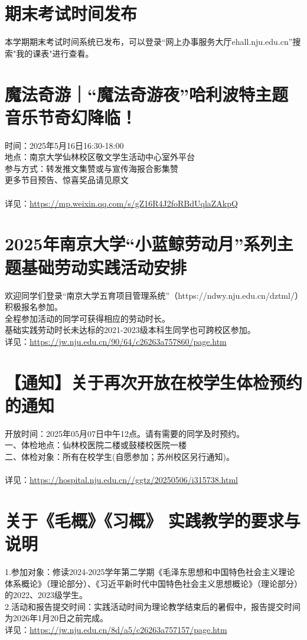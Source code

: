 \documentclass[letterpaper, 12pt]{article}
\begin{document}
\begin{multicols}{2}
\section{期末考试时间发布} %
本学期期末考试时间系统已发布，可以登录“网上办事服务大厅ehall.nju.edu.cn”搜索"我的课表"进行查看。
\section{魔法奇游｜“魔法奇游夜”哈利波特主题音乐节奇幻降临！} %
时间：2025年5月16日16:30-18:00
\\地点：南京大学仙林校区敬文学生活动中心室外平台
\\参与方式：转发推文集赞或与宣传海报合影集赞
\\更多节目预告、惊喜奖品请见原文
\\
\\详见：\url{https://mp.weixin.qq.com/s/gZ16R4J2foRBdUqlaZAkpQ}

\section{2025年南京大学“小蓝鲸劳动月”系列主题基础劳动实践活动安排} %
欢迎同学们登录“南京大学五育项目管理系统”（https://ndwy.nju.edu.cn/dztml/）积极报名参加。
\\全程参加活动的同学可获得相应的劳动时长。
\\基础实践劳动时长未达标的2021-2023级本科生同学也可跨校区参加。
\\详见：\url{https://jw.nju.edu.cn/90/64/c26263a757860/page.htm}

\section{【通知】关于再次开放在校学生体检预约的通知} %
开放时间：2025年05月07日中午12点。请有需要的同学及时预约。
\\一、体检地点：仙林校医院二楼或鼓楼校医院一楼
\\二、体检对象：所有在校学生(自愿参加；苏州校区另行通知)。
\\
\\详见：\url{https://hospital.nju.edu.cn//ggtz/20250506/i315738.html}

\section{关于《毛概》《习概》 实践教学的要求与说明} %
1.参加对象：修读2024-2025学年第二学期《毛泽东思想和中国特色社会主义理论体系概论》（理论部分）、《习近平新时代中国特色社会主义思想概论》（理论部分）的2022、2023级学生。
\\2.活动和报告提交时间：实践活动时间为理论教学结束后的暑假中，报告提交时间为2026年1月20日之前完成。
\\详见：\url{https://jw.nju.edu.cn/8d/a5/c26263a757157/page.htm}


\end{multicols}
\end{document}

